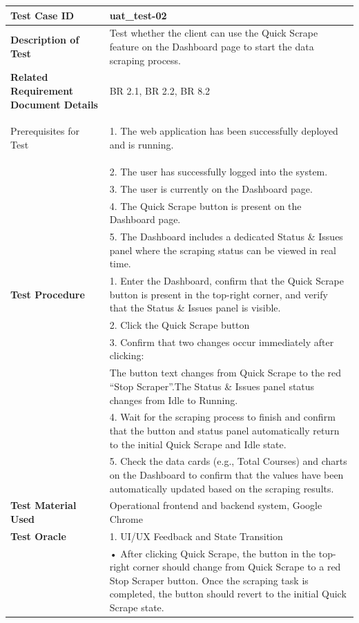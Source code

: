 \begin{table}[h]
\begin{tabularx}{\linewidth}{>{\bfseries}l X}
\hline
Test Case ID & uat\_test-02 \\ \hline
Description of Test& Test whether the client can use the Quick Scrape feature on the Dashboard page to start the data scraping process.\\ \hline
Related Requirement Document Details & BR 2.1, BR 2.2, BR 8.2\\ \hline

Prerequisites for Test& 1. The web application has been successfully deployed and is running.\\
&2. The user has successfully logged into the system.\\
&3. The user is currently on the Dashboard page.\\
&4. The Quick Scrape button is present on the Dashboard page.\\ 
&5. The Dashboard includes a dedicated Status \& Issues panel where the scraping status can be viewed in real time.\\ \hline
Test Procedure & 1. Enter the Dashboard, confirm that the Quick Scrape button is present in the top-right corner, and verify that the Status \& Issues panel is visible.\\
&2. Click the Quick Scrape button\\
&3. Confirm that two changes occur immediately after clicking:\\
&The button text changes from Quick Scrape to the red “Stop Scraper”.The Status \& Issues panel status changes from Idle to Running.\\
&4. Wait for the scraping process to finish and confirm that the button and status panel automatically return to the initial Quick Scrape and Idle state.\\
&5. Check the data cards (e.g., Total Courses) and charts on the Dashboard to confirm that the values have been automatically updated based on the scraping results.\\ \hline
Test Material Used &Operational frontend and backend system, Google Chrome\\ \hline
Test Oracle& 1. UI/UX Feedback and State Transition\\
& • After clicking Quick Scrape, the button in the top-right corner should change from Quick Scrape to a red Stop Scraper button. Once the scraping task is completed, the button should revert to the initial Quick Scrape state.\\

\end{tabularx}
\end{table}
